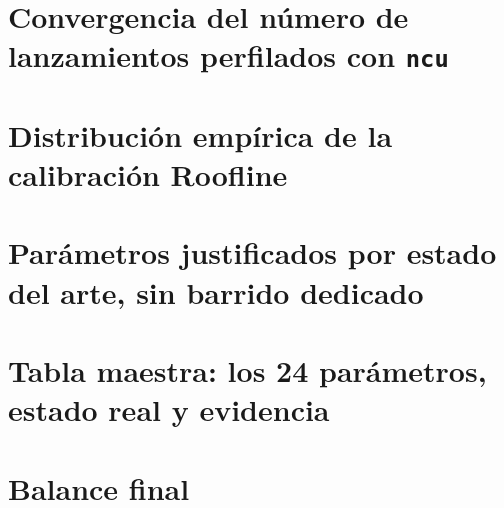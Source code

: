 \documentclass[11pt]{article}
\begin{document}


\section{Convergencia del número de lanzamientos perfilados con \texttt{ncu}}
\label{sec:ncu-convergence}



\section{Distribución empírica de la calibración Roofline}
\label{sec:calibration-distribution}



\section{Parámetros justificados por estado del arte, sin barrido dedicado}
\label{sec:literatura}



\section{Tabla maestra: los 24 parámetros, estado real y evidencia}
\label{sec:master-table}



\section{Balance final}
\label{sec:balance}





\end{document}
